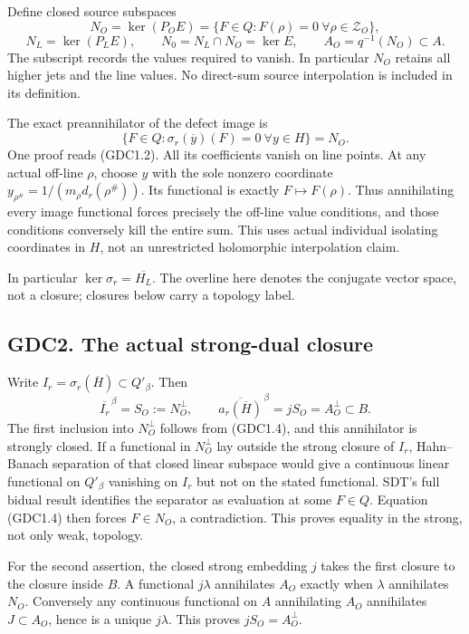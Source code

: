 Define closed source subspaces \[
N_O=\ker(P_OE)=\{F\in Q:F(\rho)=0\ \forall\rho\in\mathscr Z_O\},
\] \[
N_L=\ker(P_LE),\qquad N_0=N_L\cap N_O=\ker E,
\qquad A_O=q^{-1}(N_O)\subset A.
\tag{GDC1.3}
\] The subscript records the values required to vanish. In particular
\(N_O\) retains all higher jets and the line values. No direct-sum
source interpolation is included in its definition.

The exact preannihilator of the defect image is \[
\boxed{\{F\in Q:\sigma_r(\overline y)(F)=0\ \forall y\in H\}=N_O.}
\tag{GDC1.4}
\] One proof reads (GDC1.2). All its coefficients vanish on line points.
At any actual off-line \(\rho\), choose \(y\) with the sole nonzero
coordinate \(y_{\rho^\#}=1/(m_\rho d_r(\rho^\#))\). Its functional is
exactly \(F\mapsto F(\rho)\). Thus annihilating every image functional
forces precisely the off-line value conditions, and those conditions
conversely kill the entire sum. This uses actual individual isolating
coordinates in \(H\), not an unrestricted holomorphic interpolation
claim.

In particular \(\ker\sigma_r=\overline{H_L}\). The overline here denotes
the conjugate vector space, not a closure; closures below carry a
topology label.

\subsection{GDC2. The actual strong-dual
closure}\label{gdc2.-the-actual-strong-dual-closure}

Write \(I_r=\sigma_r(\overline H)\subset Q'_\beta\). Then \[
\boxed{\overline{I_r}^{\,\beta}=S_O:=N_O^\perp,\qquad
\overline{a_r(\overline H)}^{\,\beta}=jS_O=A_O^\perp\subset B.}
\tag{GDC2.1}
\] The first inclusion into \(N_O^\perp\) follows from (GDC1.4), and
this annihilator is strongly closed. If a functional in \(N_O^\perp\)
lay outside the strong closure of \(I_r\), Hahn--Banach separation of
that closed linear subspace would give a continuous linear functional on
\(Q'_\beta\) vanishing on \(I_r\) but not on the stated functional.
SDT's full bidual result identifies the separator as evaluation at some
\(F\in Q\). Equation (GDC1.4) then forces \(F\in N_O\), a contradiction.
This proves equality in the strong, not only weak, topology.

For the second assertion, the closed strong embedding \(j\) takes the
first closure to the closure inside \(B\). A functional \(j\lambda\)
annihilates \(A_O\) exactly when \(\lambda\) annihilates \(N_O\).
Conversely any continuous functional on \(A\) annihilating \(A_O\)
annihilates \(J\subset A_O\), hence is a unique \(j\lambda\). This
proves \(jS_O=A_O^\perp\).

